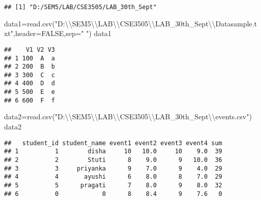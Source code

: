 \documentclass[
]{article}
\newenvironment{Shaded}{\begin{snugshade}}{\end{snugshade}}
\newcommand{\AttributeTok}[1]{\textcolor[rgb]{0.77,0.63,0.00}{#1}}
\newcommand{\ConstantTok}[1]{\textcolor[rgb]{0.00,0.00,0.00}{#1}}
\newcommand{\FunctionTok}[1]{\textcolor[rgb]{0.00,0.00,0.00}{#1}}
\newcommand{\NormalTok}[1]{#1}
\newcommand{\OtherTok}[1]{\textcolor[rgb]{0.56,0.35,0.01}{#1}}
\newcommand{\SpecialCharTok}[1]{\textcolor[rgb]{0.00,0.00,0.00}{#1}}
\newcommand{\StringTok}[1]{\textcolor[rgb]{0.31,0.60,0.02}{#1}}
\begin{document}
\begin{verbatim}
## [1] "D:/SEM5/LAB/CSE3505/LAB_30th_Sept"
\end{verbatim}

\begin{Shaded}
\begin{Highlighting}[]
\NormalTok{data1}\OtherTok{=}\FunctionTok{read.csv}\NormalTok{(}\StringTok{"D:}\SpecialCharTok{\textbackslash{}\textbackslash{}}\StringTok{SEM5}\SpecialCharTok{\textbackslash{}\textbackslash{}}\StringTok{LAB}\SpecialCharTok{\textbackslash{}\textbackslash{}}\StringTok{CSE3505}\SpecialCharTok{\textbackslash{}\textbackslash{}}\StringTok{LAB\_30th\_Sept}\SpecialCharTok{\textbackslash{}\textbackslash{}}\StringTok{Datasample.txt"}\NormalTok{,}\AttributeTok{header=}\ConstantTok{FALSE}\NormalTok{,}\AttributeTok{sep=}\StringTok{" "}\NormalTok{)}
\NormalTok{data1}
\end{Highlighting}
\end{Shaded}

\begin{verbatim}
##    V1 V2 V3
## 1 100  A  a
## 2 200  B  b
## 3 300  C  c
## 4 400  D  d
## 5 500  E  e
## 6 600  F  f
\end{verbatim}

\begin{Shaded}
\begin{Highlighting}[]
\NormalTok{data2}\OtherTok{=}\FunctionTok{read.csv}\NormalTok{(}\StringTok{"D:}\SpecialCharTok{\textbackslash{}\textbackslash{}}\StringTok{SEM5}\SpecialCharTok{\textbackslash{}\textbackslash{}}\StringTok{LAB}\SpecialCharTok{\textbackslash{}\textbackslash{}}\StringTok{CSE3505}\SpecialCharTok{\textbackslash{}\textbackslash{}}\StringTok{LAB\_30th\_Sept}\SpecialCharTok{\textbackslash{}\textbackslash{}}\StringTok{events.csv"}\NormalTok{)}
\NormalTok{data2}
\end{Highlighting}
\end{Shaded}

\begin{verbatim}
##   student_id student_name event1 event2 event3 event4 sum
## 1          1        disha     10   10.0     10    9.0  39
## 2          2        Stuti      8    9.0      9   10.0  36
## 3          3     priyanka      9    7.0      9    4.0  29
## 4          4       ayushi      6    8.0      8    7.0  29
## 5          5      pragati      7    8.0      9    8.0  32
## 6          0            0      8    8.4      9    7.6   0
\end{verbatim}
\end{document}
